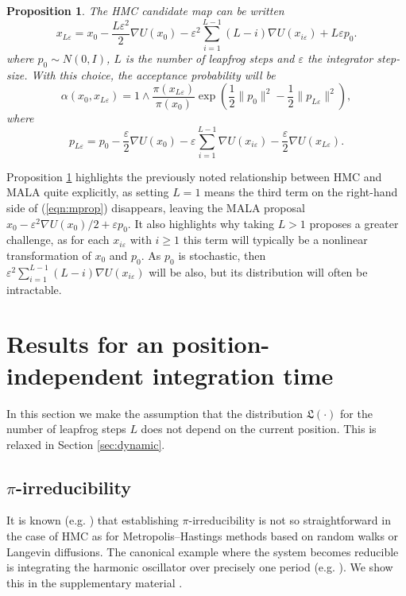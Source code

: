 \documentclass[bj,numbers,noshowframe]{imsart}
\newcommand{\e}{\varepsilon}
\theoremstyle{definition}
\theoremstyle{plain}
\newtheorem{prop}[defn]{Proposition}
\theoremstyle{definition}
\begin{document}
\begin{prop} \label{prop:mprop}
The HMC candidate map can be written
\begin{equation} \label{eqn:mprop}
x_{L\e} = x_0 - \frac{L\e^2}{2}\nabla U(x_0) - \e^2\sum_{i=1}^{L-1} (L-i)\nabla U(x_{i\e}) + L\e p_0.
\end{equation}
where $p_0 \sim N(0,I)$, $L$ is the number of leapfrog steps and $\e$ the integrator step-size.  With this choice, the acceptance probability will be
\begin{equation}
\alpha(x_0,x_{L\e}) = 1 \wedge \frac{\pi(x_{L\e})}{\pi(x_0)}\exp \left( \frac{1}{2}\|p_0\|^2 - \frac{1}{2}\|p_{L\e}\|^2 \right),
\end{equation}
where
\begin{equation} \label{eqn:mprop2}
p_{L\e} = p_0 - \frac{\e}{2}\nabla U(x_0) - \e\sum_{i=1}^{L-1} \nabla U(x_{i\e}) - \frac{\e}{2}\nabla U(x_{L\e}).
\end{equation}
\end{prop}

Proposition \ref{prop:mprop} highlights the previously noted relationship between HMC and MALA quite explicitly, as setting $L = 1$ means the third term on the right-hand side of (\ref{eqn:mprop}) disappears, leaving the MALA proposal $x_0 - \e^2\nabla U(x_0)/2 + \e p_0$.  It also highlights why taking $L >1$ proposes a greater challenge, as for each $x_{i\e}$ with $i \geq 1$ this term will typically be a nonlinear transformation of $x_0$ and $p_0$.  As $p_0$ is stochastic, then $\e^2\sum_{i=1}^{L-1} (L-i)\nabla U(x_{i\e})$ will be also, but its distribution will often be intractable.

\section{Results for an position-independent integration time}
\label{sec:fixed}

In this section we make the assumption that the distribution $\mathfrak{L}(\cdot)$ for the number of leapfrog steps $L$ does not depend on the current position.   This is relaxed in Section \ref{sec:dynamic}.

\subsection{$\pi$-irreducibility}

It is known (e.g. \citep{cances2007theoretical}) that establishing $\pi$-irreducibility is not so straightforward in the case of HMC as for Metropolis--Hastings methods based on random walks or Langevin diffusions.  The canonical example where the system becomes reducible is integrating the harmonic oscillator over precisely one period (e.g. \citep{leimkuhler2004simulating}).  We show this in the supplementary material \citep{supplement}.
\end{document}
